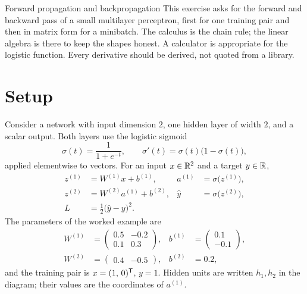 



  {Forward propagation and backpropagation}
  {This exercise asks for the forward and backward pass of a small multilayer perceptron, first for one training pair and then in matrix form for a minibatch. The calculus is the chain rule; the linear algebra is there to keep the shapes honest. A calculator is appropriate for the logistic function. Every derivative should be derived, not quoted from a library.}

\section{Setup}

Consider a network with input dimension \(2\), one hidden layer of width \(2\), and a scalar output. Both layers use the logistic sigmoid
\[
  \sigma(t) = \frac{1}{1+e^{-t}},
  \qquad
  \sigma'(t) = \sigma(t)\bigl(1-\sigma(t)\bigr),
\]
applied elementwise to vectors. For an input \(x\in\mathbb{R}^2\) and a target \(y\in\mathbb{R}\),
\begin{align}
  z^{(1)} &= W^{(1)} x + b^{(1)}, &
  a^{(1)} &= \sigma\bigl(z^{(1)}\bigr), \label{eq:forward-hidden}\\
  z^{(2)} &= W^{(2)} a^{(1)} + b^{(2)}, &
  \hat y &= \sigma\bigl(z^{(2)}\bigr), \label{eq:forward-out}\\
  L &= \tfrac12\bigl(\hat y - y\bigr)^2. \label{eq:mse}
\end{align}
The parameters of the worked example are
\begin{align*}
  W^{(1)} &= \begin{pmatrix} 0.5 & -0.2 \\ 0.1 & 0.3 \end{pmatrix},
  &
  b^{(1)} &= \begin{pmatrix} 0.1 \\ -0.1 \end{pmatrix},
  \\[0.4em]
  W^{(2)} &= \begin{pmatrix} 0.4 & -0.5 \end{pmatrix},
  &
  b^{(2)} &= 0.2,
\end{align*}
and the training pair is \(x = (1,\, 0)^{\mathsf{T}}\), \(y = 1\). Hidden units are written \(h_1,h_2\) in the diagram; their values are the coordinates of \(a^{(1)}\).

